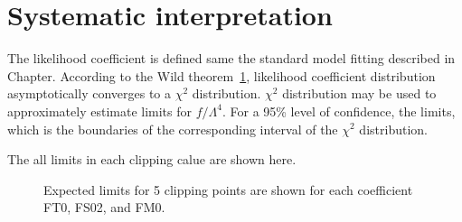 \section{Systematic interpretation}

The likelihood coefficient is defined same the standard model fitting described in Chapter{}.
According to the Wild theorem~\ref{}, likelihood coefficient distribution asymptotically converges to a $\chi^2$ distribution. 
$\chi^2$ distribution may be used to approximately estimate limits for $f/\Lambda^4$.
For a 95\% level of confidence, the limits, which is the boundaries of the corresponding interval of the $\chi^2$ distribution.

The all limits in each clipping calue are shown here.

\begin{figure}[ht]
    \centering
        \caption{Expected limits for 5 clipping points are shown for each coefficient FT0, FS02, and FM0.}
        \label{fig:ClippedLimits}
\end{figure}

